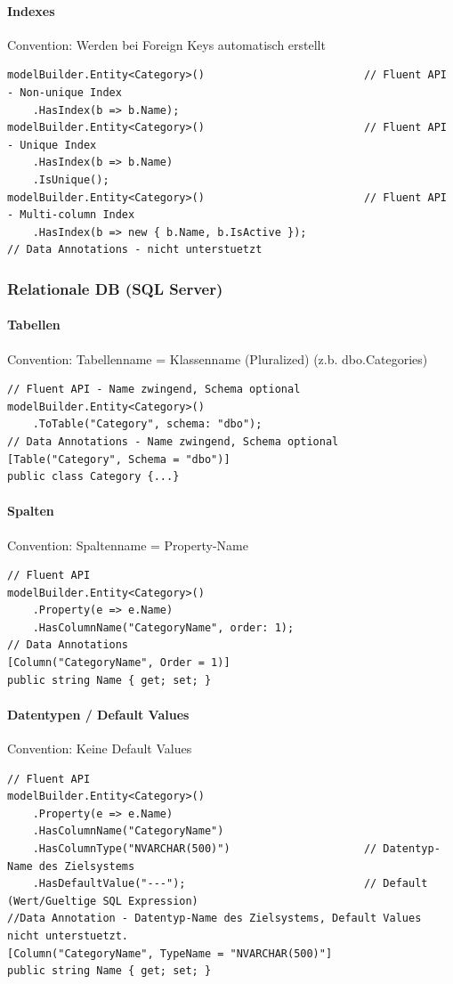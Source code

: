 \documentclass[
a4paper,
oneside,
10pt,
fleqn,
headsepline,
toc=listofnumbered, 
bibliography=totocnumbered]{scrartcl}
\begin{document}
\paragraph{Indexes} 
Convention: Werden bei Foreign Keys automatisch erstellt
\begin{lstlisting} 
modelBuilder.Entity<Category>()                         // Fluent API - Non-unique Index
    .HasIndex(b => b.Name);
modelBuilder.Entity<Category>()                         // Fluent API - Unique Index
    .HasIndex(b => b.Name)
    .IsUnique();
modelBuilder.Entity<Category>()                         // Fluent API - Multi-column Index
    .HasIndex(b => new { b.Name, b.IsActive });
// Data Annotations - nicht unterstuetzt
\end{lstlisting}

\subsubsection{Relationale DB (SQL Server)}
\paragraph{Tabellen} Convention: Tabellenname = Klassenname (Pluralized) (z.b. dbo.Categories)
\begin{lstlisting}
// Fluent API - Name zwingend, Schema optional
modelBuilder.Entity<Category>()                         
    .ToTable("Category", schema: "dbo");
// Data Annotations - Name zwingend, Schema optional
[Table("Category", Schema = "dbo")]                     
public class Category {...}
\end{lstlisting}

\paragraph{Spalten} 
Convention: Spaltenname = Property-Name
\begin{lstlisting}
// Fluent API
modelBuilder.Entity<Category>()                         
    .Property(e => e.Name)
    .HasColumnName("CategoryName", order: 1);
// Data Annotations
[Column("CategoryName", Order = 1)]                     
public string Name { get; set; }
\end{lstlisting}

\paragraph{Datentypen / Default Values}
Convention: Keine Default Values
\begin{lstlisting}
// Fluent API
modelBuilder.Entity<Category>()                         
    .Property(e => e.Name)
    .HasColumnName("CategoryName")
    .HasColumnType("NVARCHAR(500)")                     // Datentyp-Name des Zielsystems
    .HasDefaultValue("---");                            // Default (Wert/Gueltige SQL Expression)
//Data Annotation - Datentyp-Name des Zielsystems, Default Values nicht unterstuetzt.
[Column("CategoryName", TypeName = "NVARCHAR(500)"] 
public string Name { get; set; }
\end{lstlisting}
\end{document}
